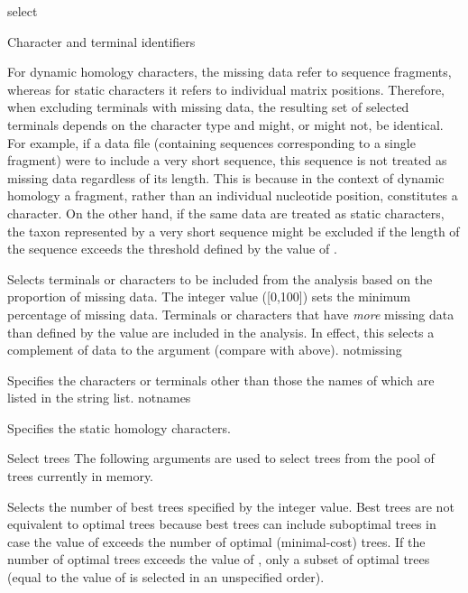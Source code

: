 \begin{command}{select}{}
\begin{arguments}
\begin{argumentgroup}{Character and terminal identifiers}
\begin{statement}
For dynamic homology characters, the missing data refer to
sequence fragments, whereas for static characters it refers to
individual matrix positions. Therefore, when excluding
terminals with missing data, the resulting set of selected
terminals depends on the character type and might, or
might not, be identical. For example, if a data file (containing
sequences corresponding to a single fragment) were to include
a very short sequence, this sequence is not treated as
missing data regardless of its length. This is because in the
context of dynamic homology a fragment, rather than an
individual nucleotide position, constitutes a character.
On the other hand, if the same data are treated as static characters,
the taxon represented by a very short sequence
might be excluded if the length of the sequence exceeds the
threshold defined by the value of .
\end{statement}

{Selects terminals or characters to be included from the analysis
based on the proportion of missing data. The
integer value ([0,100]) sets the minimum percentage of missing
data. Terminals or characters that have \emph{more} missing data
than defined by the value are included in the analysis.
In effect, this selects a complement of data to the argument 
(compare with  above).}
{notmissing} 

{Specifies the characters or terminals other than those the
names of which are listed in the string list.}
{notnames}


{Specifies the static homology characters.}
{}

\end{argumentgroup}

\begin{argumentgroup}{Select trees}
{The following arguments are used to select trees from the pool of 
trees currently in memory.}

{Selects the number of best trees specified by the integer value.
Best trees are not equivalent to optimal trees because best trees
can include suboptimal trees in case the value of
 exceeds the number of optimal (minimal-cost)
trees. If the number of optimal trees exceeds the value of
, only a subset of optimal trees (equal to the
value of  is selected in an unspecified order).} 
{}


\end{argumentgroup}
\end{arguments}
\end{command}
